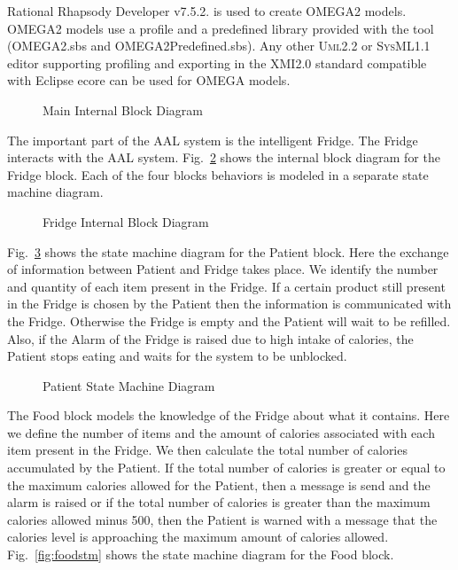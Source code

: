 \documentclass[a4paper,twoside]{article}
\def\sysml{\textsc{SysML}}
\def\uml{\textsc{Uml}}
\begin{document}
Rational Rhapsody Developer v7.5.2. \cite{test16} is used to create OMEGA2 models. OMEGA2 models use a profile and a predefined library provided with the tool (OMEGA2.sbs and OMEGA2Predefined.sbs). Any other \uml{}2.2 or \sysml{}1.1 editor supporting profiling and exporting in the XMI2.0 standard compatible with Eclipse ecore can be used for OMEGA models.

\begin{figure}[!h]
  \centering
  {}
  \caption{Main Internal Block Diagram}
  \label{fig:mainibd}
 \end{figure}
 
The important part of the AAL system is the intelligent Fridge. The Fridge interacts with the AAL system. Fig.~\ref{fig:fridgeibd} shows the internal block diagram for the Fridge block. Each of the four blocks behaviors is modeled in a separate state machine diagram.

\begin{figure}[!h]
  \centering
  {}
  \caption{Fridge Internal Block Diagram}
  \label{fig:fridgeibd}
 \end{figure}
 
Fig.~\ref{fig:patientstm} shows the state machine diagram for the Patient block. Here the exchange of information between Patient and Fridge takes place. We identify the number and quantity of each item present in the Fridge. If a certain product still present in the Fridge is chosen by the Patient then the information is  communicated with the Fridge.  Otherwise the Fridge is empty and the Patient will wait to be refilled. Also, if the Alarm of the Fridge is raised due to  high intake of calories, the Patient stops eating and waits for the system to be unblocked.
 
\begin{figure}[!h]
  \centering
  {}
  \caption{Patient State Machine Diagram}
  \label{fig:patientstm}
 \end{figure}
 
The Food block models the knowledge of the Fridge about what it contains. Here we define the number of items and the amount of calories associated with each item present in the Fridge. We then calculate the total number of calories accumulated by the Patient. If the total number of calories is greater or equal to the maximum calories allowed for the Patient, then a message is send and the alarm is raised or if the total number of calories is greater than the maximum calories allowed minus 500, then the Patient is warned with a message that the calories level is approaching the maximum amount of calories allowed. Fig.~\ref{fig:foodstm} shows the state machine diagram for the Food block.
\end{document}
